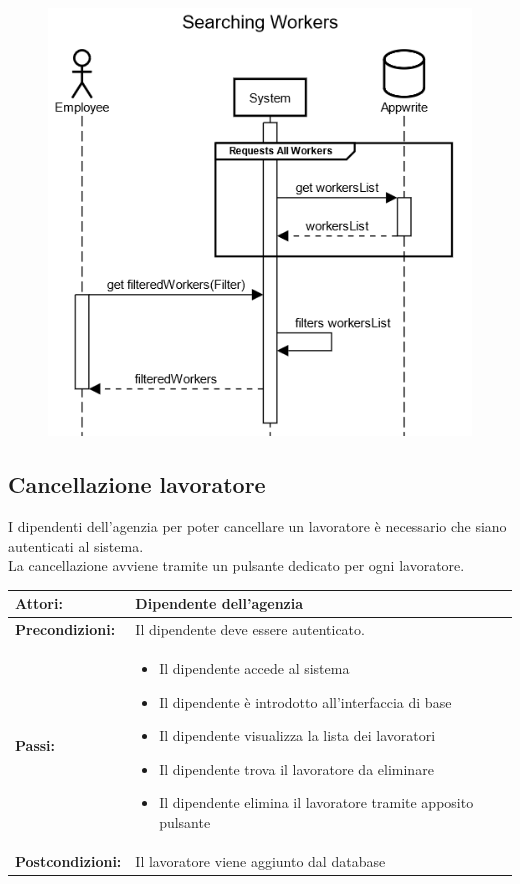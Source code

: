 \documentclass[a4paper, oneside, 12pt]{article}
\begin{document}
\begin{figure}[h!]
	\centering
	\includegraphics[width = 8 cm]{images/ricerca}
	\label{fig:Ricerca lavoratore}
\end{figure}

\newpage
\subsection{Cancellazione lavoratore}
I dipendenti dell'agenzia per poter cancellare un lavoratore è necessario che siano autenticati al sistema. \\
La cancellazione avviene tramite un pulsante dedicato per ogni lavoratore. \\

\begin{tabular}{ | l | p{11cm} | } 
	\hline
	\textbf{Attori:} & Dipendente dell'agenzia  \\ 
	\hline
	\textbf{Precondizioni:} & Il dipendente deve essere autenticato. \\
	\hline
	\textbf{Passi:} &
		\begin{itemize}
			\item Il dipendente accede al sistema
			\item Il dipendente è introdotto all'interfaccia di base
			\item Il dipendente visualizza la lista dei lavoratori
			\item Il dipendente trova il lavoratore da eliminare
			\item Il dipendente elimina il lavoratore tramite apposito pulsante
		\end{itemize} \\
	\hline
	\textbf{Postcondizioni:} &  Il lavoratore viene aggiunto dal database \\
	\hline
  \end{tabular}
\end{document}
